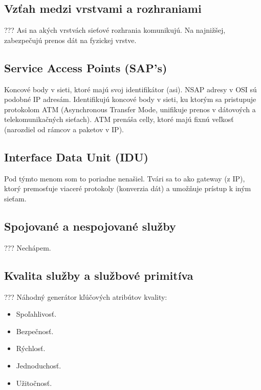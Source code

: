 \documentclass[10pt,a4paper]{article}
\begin{document}
\subsection{Vzťah medzi vrstvami a rozhraniami}  
???
Asi na akých vrstvách sieťové rozhrania komunikujú. Na najnižšej, zabezpečujú prenos dát na fyzickej vrstve.  

\subsection{Service Access Points (SAP's)} 
Koncové body v sieti, ktoré majú svoj identifikátor (asi).   
NSAP adresy v OSI sú podobné IP adresám. Identifikujú koncové body v sieti, ku ktorým sa pristupuje protokolom ATM (Asynchronous Transfer Mode, unifikuje prenos v dátovoých a telekomunikačných sieťach). ATM prenáša celly, ktoré majú fixnú veľkosť (narozdiel od rámcov a paketov v IP).  
  
\subsection{Interface Data Unit (IDU)}       
Pod týmto menom som to poriadne nenašiel. 
Tvári sa to ako gateway (z IP), ktorý premosťuje viaceré protokoly (konverzia dát) a 
umožňuje prístup k iným sieťam. 
      
\subsection{Spojované a nespojované služby}  
???
Nechápem. 


\subsection{Kvalita služby a službové primitíva}   
???
Náhodný generátor kľúčových atribútov kvality:
\begin{itemize}
\item Spoľahlivosť.
\item Bezpečnosť.
\item Rýchlosť.
\item Jednoduchosť.
\item Užitočnosť.
\end{itemize}
         
\end{document}
